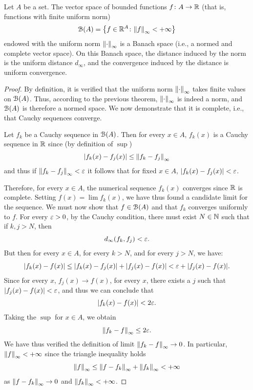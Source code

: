 \begin{theorem}%
  \label{th:limitate_completo}%
Let $A$ be a set.
The vector space
of bounded functions $f\colon A \to {\mathbb R}$
(that is, functions with finite uniform norm)
\[
  \mathcal B(A) = {\left\{ f\in {\mathbb R}^A\colon {\left\Vert f\right\Vert}_\infty < +\infty  \right\}}
\]
endowed with the uniform norm ${\left\Vert \cdot\right\Vert}_\infty$ is a Banach space (i.e., a
normed and complete vector space).
On this Banach space, the distance induced by the norm is the uniform distance
$d_\infty$, and the convergence induced by the distance is uniform convergence.
\end{theorem}
%
\begin{proof}
By definition, it is verified that the uniform norm ${\left\Vert \cdot\right\Vert}_\infty$ takes
finite values on $\mathcal B(A)$.
Thus, according to the previous theorem, ${\left\Vert \cdot\right\Vert}_\infty$ is indeed a norm,
and $\mathcal B(A)$ is therefore a normed space. We now demonstrate that it is complete,
i.e., that Cauchy sequences converge.

Let $f_k$ be a Cauchy sequence in $\mathcal B(A)$.
Then for every $x\in A$, $f_k(x)$ is a Cauchy sequence in ${\mathbb R}$ since (by
definition of $\sup$)
\[
  {\left|f_k(x) - f_j(x)\right|} \le {\left\Vert f_k - f_j\right\Vert}_\infty
\]
and thus if ${\left\Vert f_k- f_j\right\Vert}_\infty < \varepsilon$
it follows that for fixed $x\in A$, ${\left|f_k(x)-f_j(x)\right|} < \varepsilon$.

Therefore, for every $x\in A$, the numerical sequence $f_k(x)$ converges since
${\mathbb R}$ is complete. Setting $f(x) = \lim f_k(x)$, we have thus found a candidate
limit for the sequence.
We must now show that $f\in \mathcal B(A)$ and that $f_k$ converges uniformly to $f$.
For every $\varepsilon>0$, by the Cauchy condition, there must exist $N\in {\mathbb N}$ such
that if $k,j>N$, then
\[
  d_\infty(f_k,f_j) < \varepsilon.
\]
But then for every $x\in A$, for every $k>N$, and for every $j>N$, we have:
\[
  {\left|f_k(x) - f(x)\right|} \le {\left|f_k(x) - f_j(x)\right|} +
  {\left|f_j(x) - f(x)\right|} < \varepsilon + {\left|f_j(x)-f(x)\right|}.
\]
Since for every $x$, $f_j(x) \to f(x)$, for every $x$, there exists a $j$ such
that ${\left|f_j(x)-f(x)\right|} < \varepsilon$, and thus we can conclude that
\[
  {\left|f_k(x)-f(x)\right|} < 2\varepsilon.
\]
Taking the $\sup$ for $x\in A$, we obtain
\[
  {\left\Vert f_k -f\right\Vert}_\infty \le 2 \varepsilon.
\]
We have thus verified the definition of limit ${\left\Vert f_k -f\right\Vert}_\infty\to 0$. In
particular, ${\left\Vert f\right\Vert}_\infty < +\infty$ since the triangle inequality holds
\[
  {\left\Vert f\right\Vert}_\infty \le {\left\Vert f-f_k\right\Vert}_\infty + {\left\Vert f_k\right\Vert}_\infty < +\infty
\]
as ${\left\Vert f-f_k\right\Vert}_\infty \to 0$ and ${\left\Vert f_k\right\Vert}_\infty < +\infty$.
\end{proof}

